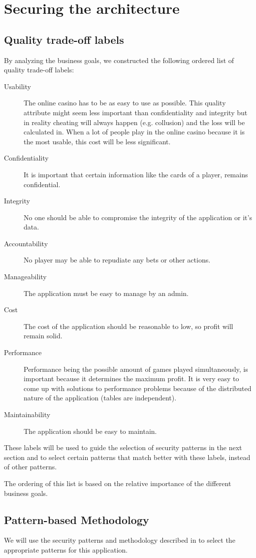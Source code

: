 \documentclass[a4paper,11pt]{report}
\begin{document}
\chapter{Securing the architecture}
\label{SecuringTheArchitecture}
\section{Quality trade-off labels}
\label{labels}
By analyzing the business goals, we constructed the following ordered list of quality trade-off labels:
\begin{description}
\item[Usability] The online casino has to be as easy to use as possible.
This quality attribute might seem less important than confidentiality and
integrity but in reality cheating will always happen (e.g. collusion) and
the loss will be calculated in. When a lot of people play in the online
casino because it is the most usable, this cost will be less significant.
\item[Confidentiality] It is important that certain information like the cards of a player, remains
confidential.
\item[Integrity] No one should be able to compromise the integrity of the application or it's data.
\item[Accountability] No player may be able to repudiate any bets or other actions.
\item[Manageability] The application must be easy to manage by an admin.
\item[Cost] The cost of the application should be reasonable to low, so profit will remain solid.
\item[Performance] Performance being the possible amount of games played simultaneously, is important because it
determines the maximum profit. It is very easy to come up with solutions
to performance problems because of the distributed nature of the
application (tables are independent).
\item[Maintainability] The application should be easy to maintain.
\end{description}
These labels will be used to guide the selection of security patterns in the next section and to select certain
patterns that match better with these labels, instead of other patterns.

The ordering of this list is based on the relative importance of the different business goals.

\section{Pattern-based Methodology}
We will use the security patterns and methodology described in \cite{yskout} to select the appropriate patterns
for this application.
\end{document}

